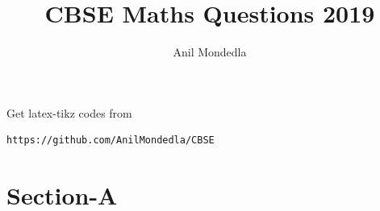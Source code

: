 \documentclass[journal,12pt,twocolumn]{IEEEtran}
\begin{document}
     \def\rightbox#1{\makebox[0in][r]{#1}}
     \def\centbox#1{\makebox[0in]{#1}}
     \def\topbox#1{\raisebox{-\baselineskip}[0in][0in]{#1}}
     \def\midbox#1{\raisebox{-0.5\baselineskip}[0in][0in]{#1}}
\vspace{3cm}
\title{CBSE Maths Questions 2019}
\author{Anil Mondedla}
\maketitle
\newpage
\bigskip
\renewcommand{\thefigure}{\theenumi}
\renewcommand{\thetable}{\theenumi}
%
Get latex-tikz codes from 
%
\begin{lstlisting}
https://github.com/AnilMondedla/CBSE
\end{lstlisting}
\section{Section-A}
\end{document}
